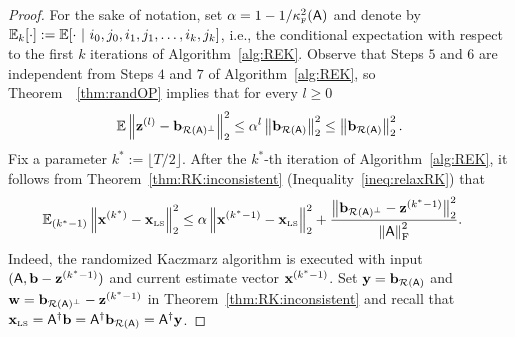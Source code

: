 \begin{proof}
%
%
For the sake of notation, set $\alpha =1- 1/\kappaFS(\matA)$ and denote by $\EE_{k}[\cdot] := \EE[\cdot \ |\ i_0,j_0, i_1,j_1,\ldots , i_k, j_k]$, i.e., the conditional expectation with respect to the first $k$ iterations of Algorithm~\ref{alg:REK}. Observe that Steps $5$ and $6$ are independent from Steps $4$ and $7$ of Algorithm~\ref{alg:REK}, so Theorem~~\ref{thm:randOP} implies that for every $l\geq 0$
\begin{equation}\label{eq:improve}
\EE \norm{\z^{(l)} - \bc }^2 \leq \alpha^l \norm{\br}^2 \leq \norm{\br}^2.
\end{equation}
Fix a parameter $k^* := \lfloor T/2 \rfloor$. After the $k^*$-th iteration of Algorithm~\ref{alg:REK}, it follows from Theorem~\ref{thm:RK:inconsistent} (Inequality~\eqref{ineq:relaxRK}) that
\begin{align*}
	\EE_{(k^*-1)} \norm{\x^{(k^*)} - \xls}^2 & \leq  \alpha  \norm{\x^{(k^* - 1)} - \xls}^2 + \frac{ \norm{\bc - \z^{(k^* - 1)}}^2}{\frobnorm{\matA}^2}.
\end{align*}
Indeed, the randomized Kaczmarz algorithm is executed with input $(\matA, \b - \z^{(k^*-1)})$ and current estimate vector $\x^{(k^* -1)}$. Set $\y=\br$ and $\w=\bc - \z^{(k^*-1)}$ in Theorem~\ref{thm:RK:inconsistent} and recall that $\xls=\pinv{\matA} \b = \pinv{\matA}\br = \pinv{\matA}\y$.
%


\end{proof}
